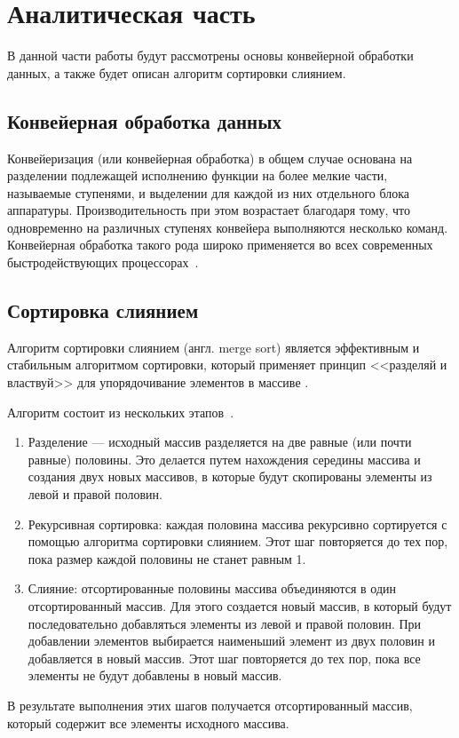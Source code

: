 \chapter{Аналитическая часть}
В данной части работы будут рассмотрены основы конвейерной обработки данных, а также будет описан алгоритм сортировки слиянием.

\section{Конвейерная обработка данных}
Конвейеризация (или конвейерная обработка) в общем случае основана на разделении подлежащей исполнению функции на более мелкие части, называемые ступенями, и выделении для каждой из них отдельного блока аппаратуры. Производительность при этом возрастает благодаря тому, что одновременно на различных ступенях конвейера выполняются несколько команд. Конвейерная обработка такого рода широко применяется во всех современных быстродействующих процессорах~\cite{conveyor_desc}.

\section{Сортировка слиянием}
Алгоритм сортировки слиянием (англ. merge sort) является эффективным и стабильным алгоритмом сортировки, который применяет принцип <<разделяй и властвуй>> для упорядочивание элементов в массиве \cite{merge-sort}.

Алгоритм состоит из нескольких этапов~\cite{merge-sort}.
\begin{enumerate}
	\item Разделение ---  исходный массив разделяется на две равные (или почти равные) половины. Это делается путем нахождения середины массива и создания двух новых массивов, в которые будут скопированы элементы из левой и правой половин.
	
	\item Рекурсивная сортировка: каждая половина массива рекурсивно сортируется с помощью алгоритма сортировки слиянием. Этот шаг повторяется до тех пор, пока размер каждой половины не станет равным 1.
	
	\item Слияние: отсортированные половины массива объединяются в один отсортированный массив. Для этого создается новый массив, в который будут последовательно добавляться элементы из левой и правой половин. При добавлении элементов выбирается наименьший элемент из двух половин и добавляется в новый массив. Этот шаг повторяется до тех пор, пока все элементы не будут добавлены в новый массив.
\end{enumerate}
В результате выполнения этих шагов получается отсортированный массив, который содержит все элементы исходного массива.

